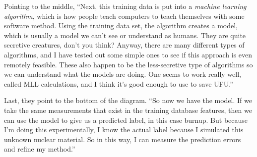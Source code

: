 {\begin{shadequote}
  Pointing to the middle, ``Next, this training data is put into a
  \textit{machine learning algorithm}\footnotemark[5], which is how people
  teach computers to teach themselves with some software method. Using the
  training data set, the algorithm creates a model, which is usually a model we
  can't see or understand as humans. They are quite secretive creatures, don't
  you think?  Anyway, there are many different types of algorithms, and I have
  tested out some simple ones to see if this approach is even remotely
  feasible. These also happen to be the less-secretive type of algorithms so we
  can understand what the models are doing. One seems to work really well,
  called \gls{MLL} calculations\footnotemark[6], and I think it's good enough
  to use to save UFU.''
  
  Last, they point to the bottom of the diagram. ``So now we have the model. If
  we take the same measurements that exist in the training database features,
  then we can use the model to give us a predicted label, in this case burnup.
  But because I'm doing this experimentally, I know the actual label because I
  simulated this unknown nuclear material. So in this way, I can measure the
  prediction errors and refine my method.''
  
\end{shadequote}

}
